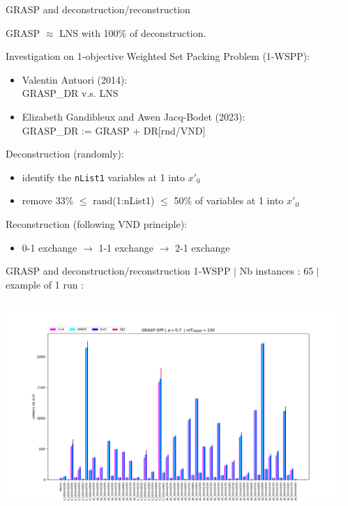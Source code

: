 \documentclass[10pt,xcolor=dvipsnames]{beamer}
\begin{document}
\begin{frame}[fragile]{GRASP and deconstruction/reconstruction}

GRASP $\approx$ LNS with 100\% of deconstruction.
\bigskip

Investigation on 1-objective Weighted Set Packing Problem (1-WSPP): 

\begin{itemize} 
\item Valentin Antuori (2014): \\ GRASP\_DR v.s. LNS

\item Elizabeth Gandibleux and Awen Jacq-Bodet (2023): \\  GRASP\_DR := GRASP + DR[rnd/VND]
\end{itemize}
\bigskip

Deconstruction (randomly):\\
\begin{itemize}
\item identify the \texttt{nList1} variables at 1 into $x'_0$
\item remove 33\% $\le$ rand(1:nList1) $\le$ 50\% of   variables at 1 into $x'_0$
\end{itemize}

Reconstruction (following VND principle):\\
\begin{itemize}
\item 0-1 exchange $ \longrightarrow$
 1-1 exchange $ \longrightarrow$
 2-1 exchange
\end{itemize}

\end{frame}

\begin{frame}[fragile]{GRASP and deconstruction/reconstruction}
1-WSPP $\mid$ Nb instances : 65 $\mid$ example of 1 run :
\begin{columns}
\begin{column}{0.9\textwidth}
\includegraphics[scale=0.375]{GRASPDR.png}
\end{column}
\begin{column}{0.5\textwidth}
\end{column}
\end{columns}
\end{frame}
\end{document}
